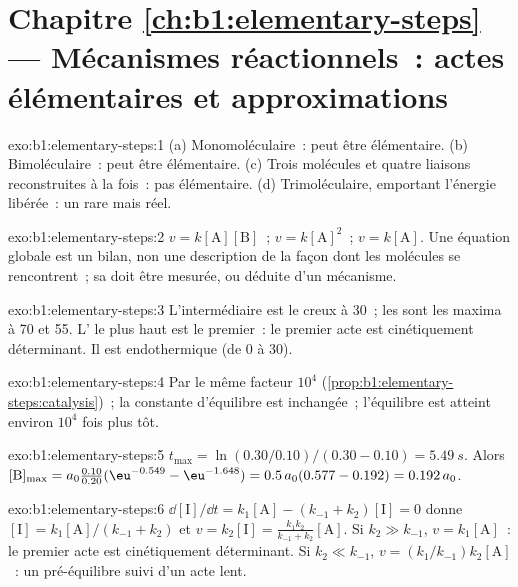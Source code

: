 \section*{Chapitre \ref{ch:b1:elementary-steps} --- Mécanismes réactionnels~: actes élémentaires et approximations}

\begin{solution}{exo:b1:elementary-steps:1}
(a) Monomoléculaire~: peut être élémentaire. (b) Bimoléculaire~: peut
être élémentaire. (c) Trois molécules et quatre liaisons reconstruites à
la fois~: pas élémentaire. (d) Trimoléculaire,  emportant
l'énergie libérée~: un  rare mais réel.
\end{solution}

\begin{solution}{exo:b1:elementary-steps:2}
$v = k[\mathrm{A}][\mathrm{B}]$~; $v = k[\mathrm{A}]^2$~; $v = k[\mathrm{A}]$.
Une équation globale est un bilan, non une description de la façon dont
les molécules se rencontrent~; sa  doit être mesurée, ou
déduite d'un mécanisme.
\end{solution}

\begin{solution}{exo:b1:elementary-steps:3}
L'intermédiaire est le creux à 30~; les  sont les
maxima à 70 et 55. L' le plus haut est le premier~: le
premier acte est cinétiquement déterminant. Il est endothermique (de 0
à 30).
\end{solution}

\begin{solution}{exo:b1:elementary-steps:4}
Par le même facteur $10^4$ (\cref{prop:b1:elementary-steps:catalysis})~;
la constante d'équilibre est inchangée~; l'équilibre est atteint environ
$10^4$ fois plus tôt.
\end{solution}

\begin{solution}{exo:b1:elementary-steps:5}
$t_{\max} = \ln(0.30/0.10)/(0.30 - 0.10) = \qty{5.49}{s}$. Alors
$[\mathrm{B}]_{\max} = a_0\frac{0.10}{0.20}(\eu^{-0.549} - \eu^{-1.648}) =
0.5\,a_0(0.577 - 0.192) = 0.192\,a_0$.
\end{solution}

\begin{solution}{exo:b1:elementary-steps:6}
$\dd[\mathrm{I}]/\dd t = k_1[\mathrm{A}] - (k_{-1} + k_2)[\mathrm{I}] = 0$
donne $[\mathrm{I}] = k_1[\mathrm{A}]/(k_{-1} + k_2)$ et $v = k_2[\mathrm{I}]
= \frac{k_1k_2}{k_{-1}+k_2}[\mathrm{A}]$. Si $k_2 \gg k_{-1}$, $v =
k_1[\mathrm{A}]$~: le premier acte est cinétiquement déterminant. Si
$k_2 \ll k_{-1}$,
$v = (k_1/k_{-1})k_2[\mathrm{A}]$~: un pré-équilibre suivi d'un acte
lent.
\end{solution}

